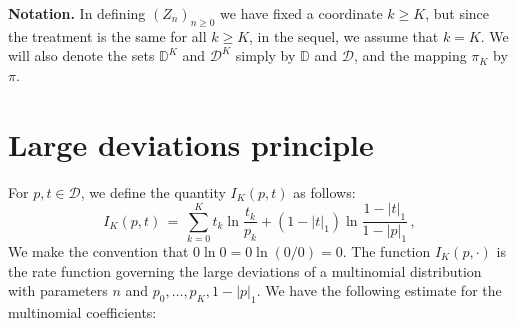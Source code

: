 \documentclass[a4paper,12pt]{article}
\theoremstyle{definition}
\theoremstyle{remark}
\def \cD {\mathcal{D}}
\def \dD {\mathbb{D}}
\def \R {\mathbb{R}}
\def \Zt {(Z_n)_{n\geq 0}}
\def \zk {\{\, 0,\dots,K \,\}}
\begin{document}
\textbf{Notation.}
In defining $\Zt$ we have fixed a coordinate $k\geq K$, but since the treatment is the same for all $k\geq K$,
in the sequel,
we assume that $k=K$.
We will also denote the sets $\dD^K$ and $\cD^K$ simply by $\dD$ and $\cD$,
and the mapping $\pi_K$ by $\pi$.

\section{Large deviations principle}\label{LDtrans}
For
$p,t\in\cD$, 
we define the quantity
$I_K(p,t)$
as follows:
%
$$I_K(p,t)\,=\,
\sum_{k=0}^K t_k\ln\frac{t_k}{p_k}+
(1-|t|_1)
\ln\frac{1-|t|_1}{1-|p|_1}\,,$$
%
%
We make the convention that 
$0\ln0=0\ln(0/0)=0$.
The function
$I_K(p,\cdot)$
is the rate function
governing the large deviations of a multinomial distribution
with parameters $n$ and $p_0,\dots,p_K,1-|p|_1$.
We have the following estimate for the multinomial coefficients:
\end{document}
